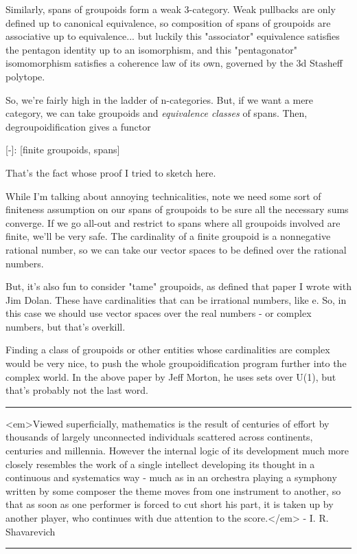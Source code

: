 Similarly, spans of groupoids form a weak 3-category.  Weak pullbacks
are only defined up to canonical equivalence, so composition of spans
of groupoids are associative up to equivalence... but luckily this
"associator" equivalence satisfies the pentagon identity up to an
isomorphism, and this "pentagonator" isomomorphism satisfies a 
coherence law of its own, governed by the 3d Stasheff polytope.

So, we're fairly high in the ladder of n-categories.  But, if we
want a mere category, we can take groupoids and \emph{equivalence classes}
of spans.  Then, degroupoidification gives a functor

[-]: [finite groupoids, spans] 

That's the fact whose proof I tried to sketch here.  

While I'm talking about annoying technicalities, note we need 
some sort of finiteness assumption on our spans of groupoids
to be sure all the necessary sums converge.   If we go all-out
and restrict to spans where all groupoids involved are finite,
we'll be very safe.  The cardinality of a finite groupoid is a
nonnegative rational number, so we can take our vector spaces to 
be defined over the rational numbers.

But, it's also fun to consider "tame" groupoids, as defined that 
paper I wrote with Jim Dolan.  These have cardinalities that can 
be irrational numbers, like e.   So, in this case we should use
vector spaces over the real numbers - or complex numbers, but that's
overkill.

Finding a class of groupoids or other entities whose cardinalities
are complex would be very nice, to push the whole groupoidification
program further into the complex world.  In the above paper by 
Jeff Morton, he uses sets over U(1), but that's probably not the
last word.


\par\noindent\rule{\textwidth}{0.4pt}
<em>Viewed superficially, mathematics is the result of centuries of effort by
thousands of largely unconnected individuals scattered across continents, 
centuries and millennia.  However the internal logic of its development
much more closely resembles the work of a single intellect developing its
thought in a continuous and systematics way - much as in an orchestra playing
a symphony written by some composer the theme moves from one instrument 
to another, so that as soon as one performer is forced to cut short his part,
it is taken up by another player, who continues with due attention to the
score.</em> - I. R. Shavarevich

\par\noindent\rule{\textwidth}{0.4pt}

